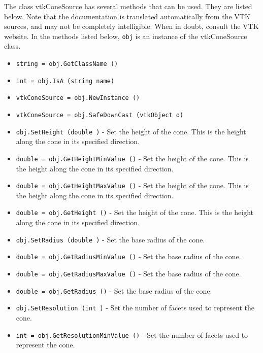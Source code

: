 The class vtkConeSource has several methods that can be used.
  They are listed below.
Note that the documentation is translated automatically from the VTK sources,
and may not be completely intelligible.  When in doubt, consult the VTK website.
In the methods listed below, \verb|obj| is an instance of the vtkConeSource class.
\begin{itemize}
\item  \verb|string = obj.GetClassName ()|

\item  \verb|int = obj.IsA (string name)|

\item  \verb|vtkConeSource = obj.NewInstance ()|

\item  \verb|vtkConeSource = obj.SafeDownCast (vtkObject o)|

\item  \verb|obj.SetHeight (double )| -  Set the height of the cone. This is the height along the cone in
 its specified direction.

\item  \verb|double = obj.GetHeightMinValue ()| -  Set the height of the cone. This is the height along the cone in
 its specified direction.

\item  \verb|double = obj.GetHeightMaxValue ()| -  Set the height of the cone. This is the height along the cone in
 its specified direction.

\item  \verb|double = obj.GetHeight ()| -  Set the height of the cone. This is the height along the cone in
 its specified direction.

\item  \verb|obj.SetRadius (double )| -  Set the base radius of the cone.

\item  \verb|double = obj.GetRadiusMinValue ()| -  Set the base radius of the cone.

\item  \verb|double = obj.GetRadiusMaxValue ()| -  Set the base radius of the cone.

\item  \verb|double = obj.GetRadius ()| -  Set the base radius of the cone.

\item  \verb|obj.SetResolution (int )| -  Set the number of facets used to represent the cone.

\item  \verb|int = obj.GetResolutionMinValue ()| -  Set the number of facets used to represent the cone.


\end{itemize}
